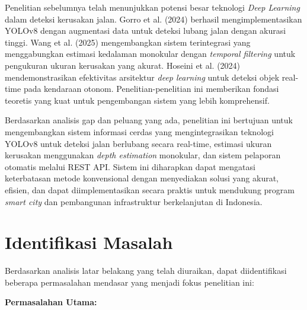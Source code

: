 \documentclass[12pt,a4paper]{report}
\begin{document}
Penelitian sebelumnya telah menunjukkan potensi besar teknologi \textit{Deep Learning} dalam deteksi kerusakan jalan. Gorro et al. (2024) berhasil mengimplementasikan YOLOv8 dengan augmentasi data untuk deteksi lubang jalan dengan akurasi tinggi. Wang et al. (2025) mengembangkan sistem terintegrasi yang menggabungkan estimasi kedalaman monokular dengan \textit{temporal filtering} untuk pengukuran ukuran kerusakan yang akurat. Hoseini et al. (2024) mendemonstrasikan efektivitas arsitektur \textit{deep learning} untuk deteksi objek real-time pada kendaraan otonom. Penelitian-penelitian ini memberikan fondasi teoretis yang kuat untuk pengembangan sistem yang lebih komprehensif.

Berdasarkan analisis gap dan peluang yang ada, penelitian ini bertujuan untuk mengembangkan sistem informasi cerdas yang mengintegrasikan teknologi YOLOv8 untuk deteksi jalan berlubang secara real-time, estimasi ukuran kerusakan menggunakan \textit{depth estimation} monokular, dan sistem pelaporan otomatis melalui REST API. Sistem ini diharapkan dapat mengatasi keterbatasan metode konvensional dengan menyediakan solusi yang akurat, efisien, dan dapat diimplementasikan secara praktis untuk mendukung program \textit{smart city} dan pembangunan infrastruktur berkelanjutan di Indonesia.

\section{Identifikasi Masalah}

Berdasarkan analisis latar belakang yang telah diuraikan, dapat diidentifikasi beberapa permasalahan mendasar yang menjadi fokus penelitian ini:

\textbf{Permasalahan Utama:}
\end{document}
